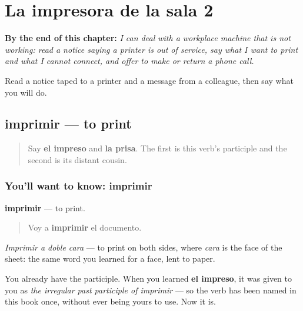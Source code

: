 
\chapter{La impresora de la sala 2}
\label{ch:es-oficina}

\begin{chapteropening}
\textbf{By the end of this chapter:} \emph{I can deal with a workplace machine that is not working: read a notice saying a printer is out of service, say what I want to print and what I cannot connect, and offer to make or return a phone call.}

Read a notice taped to a printer and a message from a colleague, then say what you will do.
\end{chapteropening}

\section[imprimir]{imprimir — to print}

\label{lesson:ES-C469-imprimir}



\begin{quote}
Say \textbf{el impreso} and \textbf{la prisa}. The first is this verb's participle and the second is its distant cousin.
\end{quote}

\subsection*{You'll want to know: imprimir}
\textbf{imprimir} — to print.

\begin{quote}
Voy a \textbf{imprimir} el documento.
\end{quote}

\emph{Imprimir a doble cara} — to print on both sides, where \emph{cara} is the face of the sheet: the same word you learned for a face, lent to paper.

You already have the participle. When you learned \textbf{el impreso}, it was given to you as \emph{the irregular past participle of imprimir} — so the verb has been named in this book once, without ever being yours to use. Now it is.

